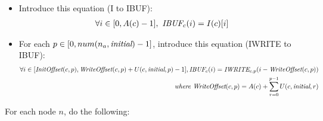 \begin{itemize}
\item Introduce this equation (I to IBUF):
\begin{align*}
\forall i \in [0,A(c)-1],~\mbox{\it IBUF}_{c}(i) = I(c)[i] \\
\end{align*}

\item For each $p \in [0, num(n_a, \mbox{\it initial})-1]$, introduce this
equation (IWRITE to IBUF):
\begin{align*}
\forall i \in [\mbox{\it InitOffset}(c,p), \mbox{\it WriteOffset}(c,p)+U(c, \mbox{\it initial}, p)-1],
\mbox{\it IBUF}_{c}(i) = \mbox{\it IWRITE}_{c, p}(i - \mbox{\it WriteOffset}(c,p)) \\
\mbox{\it where WriteOffset}(c,p) = A(c) + \sum_{r=0}^{p-1} U(c, \mbox{\it initial}, r)
\end{align*}

\end{itemize}
For each node $n$, do the following:
